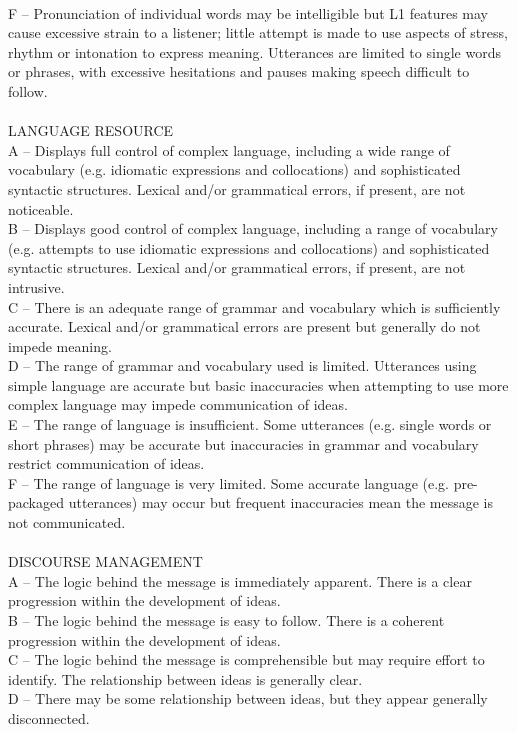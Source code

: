 \documentclass{report}
\begin{document}
\begin{tcolorbox}[breakable, colback=white, colframe=black, title=Direct Scoring Prompt]
\\F -- Pronunciation of individual words may be intelligible but L1 features may cause excessive strain to a listener; little attempt is made to use aspects of stress, rhythm or intonation to express meaning. Utterances are limited to single words or phrases, with excessive hesitations and pauses making speech difficult to follow.
\\\\
LANGUAGE RESOURCE
\\A -- Displays full control of complex language, including a wide range of vocabulary (e.g. idiomatic expressions and collocations) and sophisticated syntactic structures. Lexical and/or grammatical errors, if present, are not noticeable.
\\B -- Displays good control of complex language, including a range of vocabulary (e.g. attempts to use idiomatic expressions and collocations) and sophisticated syntactic structures. Lexical and/or grammatical errors, if present, are not intrusive.
\\C -- There is an adequate range of grammar and vocabulary which is sufficiently accurate. Lexical and/or grammatical errors are present but generally do not impede meaning.
\\D -- The range of grammar and vocabulary used is limited. Utterances using simple language are accurate but basic inaccuracies when attempting to use more complex language may impede communication of ideas.
\\E -- The range of language is insufficient. Some utterances (e.g. single words or short phrases) may be accurate but inaccuracies in grammar and vocabulary restrict communication of ideas.
\\F -- The range of language is very limited. Some accurate language (e.g. pre-packaged utterances) may occur but frequent inaccuracies mean the message is not communicated.
\\\\
DISCOURSE MANAGEMENT
\\A -- The logic behind the message is immediately apparent. There is a clear progression within the development of ideas.
\\B -- The logic behind the message is easy to follow. There is a coherent progression within the development of ideas.
\\C -- The logic behind the message is comprehensible but may require effort to identify. The relationship between ideas is generally clear.
\\D -- There may be some relationship between ideas, but they appear generally disconnected.

\end{tcolorbox}
\end{document}
